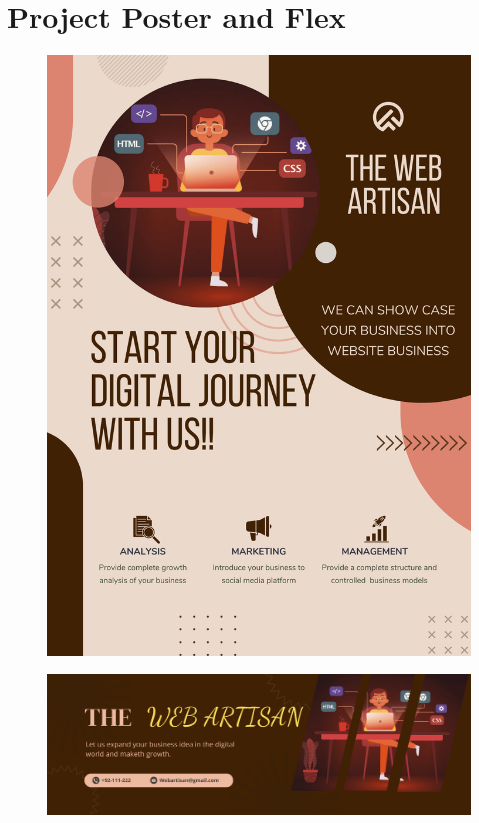 \documentclass[12pt,a4paper]{article}
\begin{document}
\section{Project Poster and Flex}
    \begin{figure}[h!]
        \centering
        \includegraphics[scale=0.20]{Files/POSTER.png}
    \end{figure}
    \begin{figure}[h!]
        \centering
        \includegraphics[scale=0.20]{Files/FLEX.png}
    \end{figure}
\end{document}
